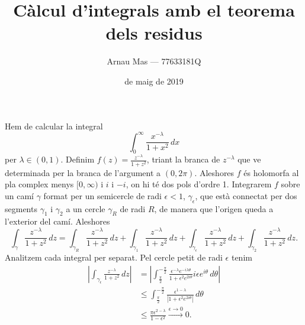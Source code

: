 \documentclass[12pt]{article}
\title{\sffamily {\bfseries Seminari 2:} Càlcul d'integrals amb el teorema dels residus}
\author{\sffamily Arnau Mas --- 77633181Q}
\date{\sffamily 17 de maig de 2019}
\numberwithin{table}{section}
\numberwithin{figure}{section}
\numberwithin{equation}{section}
\newcommand{\abs}[1]{\left\lvert #1 \right\rvert}
\begin{document}
\maketitle

Hem de calcular la integral
\begin{equation*}
	\int_0^\infty \frac{x^{-\lambda}}{1 + x^2} \, dx
\end{equation*}
per \( \lambda \in (0,1) \). Definim \( f(z) = \frac{z^{-\lambda}}{1 + z^2} \), triant la branca de \( z^{-\lambda} \) que ve determinada per la branca de l'argument a \( (0, 2\pi) \). Aleshores \( f \) és holomorfa al pla complex menys \( [0, \infty) \) i \( i \) i \( -i \), on hi té dos pols d'ordre 1. Integrarem \( f \) sobre un camí \( \gamma \) format per un semicercle de radi \( \epsilon < 1 \), \( \gamma_\epsilon \), que està connectat per dos segments \( \gamma_1 \) i \( \gamma_2 \) a un cercle \( \gamma_R \) de radi \( R \), de manera que l'origen queda a l'exterior del camí. Aleshores
\begin{equation*}
	\int_\gamma \frac{z^{-\lambda}}{1 + z^2} \, dz = \int_{\gamma_R} \frac{z^{-\lambda}}{1 + z^2} \, dz + \int_{\gamma_1} \frac{z^{-\lambda}}{1 + z^2} \, dz + \int_{\gamma_\epsilon} \frac{z^{-\lambda}}{1 + z^2} \, dz + \int_{\gamma_2} \frac{z^{-\lambda}}{1 + z^2} \, dz.
\end{equation*}
Analitzem cada integral per separat. Pel cercle petit de radi \( \epsilon \) tenim
\begin{align*}
	\abs{\int_{\gamma_\epsilon} \frac{z^{-\lambda}}{1 + z^2} \, dz} & = \abs{\int_{\frac{\pi}{2}}^{-\frac{\pi}{2}} \frac{\epsilon^{-\lambda}e^{-i\lambda\theta}}{1 + \epsilon^2 e^{2i\theta}} i\epsilon e^{i\theta} \, d\theta} \\
																																	& \leq \int_{\frac{\pi}{2}}^{-\frac{\pi}{2}} \frac{\epsilon^{1 - \lambda}}{\abs{1 + \epsilon^2 e^{2i\theta}}} \, d\theta \\
																																	& \leq \frac{\pi\epsilon^{2 - \lambda}}{1 - \epsilon^2} \xrightarrow{\epsilon \to 0} 0.
\end{align*}
\end{document}
